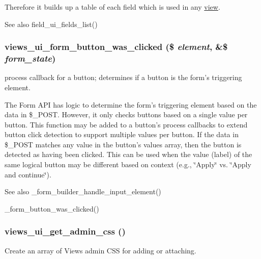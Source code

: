 Therefore it builds up a table of each field which is used in any \hyperlink{classview}{view}.

\begin{DoxySeeAlso}{See also}
field\_\-ui\_\-fields\_\-list() 
\end{DoxySeeAlso}
\hypertarget{admin_8inc_acec4a5aeaa4ce37c0cd093b55c7704fc}{
\subsubsection[{views\_\-ui\_\-form\_\-button\_\-was\_\-clicked}]{\setlength{\rightskip}{0pt plus 5cm}views\_\-ui\_\-form\_\-button\_\-was\_\-clicked (\$ {\em element}, \/  \&\$ {\em form\_\-state})}}
\label{admin_8inc_acec4a5aeaa4ce37c0cd093b55c7704fc}
process callback for a button; determines if a button is the form's triggering element.

The Form API has logic to determine the form's triggering element based on the data in \$\_\-POST. However, it only checks buttons based on a single value per button. This function may be added to a button's process callbacks to extend button click detection to support multiple values per button. If the data in \$\_\-POST matches any value in the button's values array, then the button is detected as having been clicked. This can be used when the value (label) of the same logical button may be different based on context (e.g., \char`\"{}Apply\char`\"{} vs. \char`\"{}Apply and continue\char`\"{}).

\begin{DoxySeeAlso}{See also}
\_\-form\_\-builder\_\-handle\_\-input\_\-element() 

\_\-form\_\-button\_\-was\_\-clicked() 
\end{DoxySeeAlso}
\hypertarget{admin_8inc_a1aeee5f53a84b56640cb7e41cf288eb3}{
\subsubsection[{views\_\-ui\_\-get\_\-admin\_\-css}]{\setlength{\rightskip}{0pt plus 5cm}views\_\-ui\_\-get\_\-admin\_\-css ()}}
\label{admin_8inc_a1aeee5f53a84b56640cb7e41cf288eb3}
Create an array of Views admin CSS for adding or attaching.

